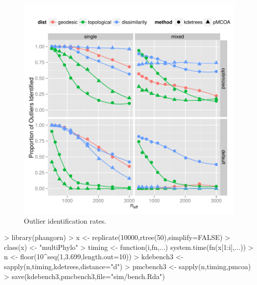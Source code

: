 \documentclass{article}
\begin{document}
\begin{figure}
  \centering
  \includegraphics{img/tpr}
  \caption{Outlier identification rates.}
  \label{fig:tprplot}
\end{figure}


\begin{Schunk}
\begin{Sinput}
> library(phangorn)
> x <- replicate(10000,rtree(50),simplify=FALSE)
> class(x) <- "multiPhylo"
> timing <- function(i,fn,...) system.time(fn(x[1:i],...))
> n <- floor(10^seq(1,3.699,length.out=10))
> kdebench3 <- sapply(n,timing,kdetrees,distance="d")
> pmcbench3 <- sapply(n,timing,pmcoa)
> save(kdebench3,pmcbench3,file="sim/bench.Rda")
\end{Sinput}
\end{Schunk}

\begin{Schunk}
\end{Schunk}
\end{document}
